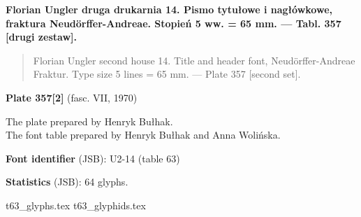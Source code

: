 \documentclass[12pt]{article}
\newcommand{\bg}{\begingl}
\newcommand{\pismoPL}[1]{{\relsize{2}\Junicode\textbf{#1}}}
\newcommand{\pismoEN}[1]{{\relsize{1}\Junicode\begin{quote}#1\end{quote}}}
\newcommand{\plate}[3]{\textbf{Plate #1} (fasc. #2, #3)}
\newcommand{\exampleBib}[1]{{\relsize{2}\Junicode\textbf{The
      example:}\\[2ex] CATALOGUS LIBRORUM \textbf{#1}}}
\newcommand{\exampleDesc}[1]{{\relsize{0}\Junicode#1}}
\newcommand{\exampleDig}[1]{{\relsize{0}\Junicode \textbf{Digitization(s) [JSB]:} #1}}
\newcommand{\exampleLib}[1]{{\relsize{0}\Junicode \textbf{Library:} #1}}
\newcommand{\examplePL}[1]{}
\newcommand{\exampleEN}[1]{}
\newcommand{\fontID}[2]{{\relsize{1}\Junicode\textbf{Font identifier} (JSB): #1 (table #2)}}
\newcommand{\fontstat}[1]{{\relsize{1}\Junicode\textbf{Statistics} (JSB): #1 glyphs.}}
\newcommand{\exampleRef}[1]{{\relsize{0}\Junicode \textbf{References:} #1}}
\newcommand{\examplePage}[1]{{Page reference: \relsize{0}\Junicode#1}}
\begin{document}
 \pismoPL{Florian Ungler druga drukarnia 14.  Pismo tytułowe i
   nagłówkowe, fraktura Neudörffer-Andreae. Stopień 5 ww. = 65 mm. —
   Tabl. 357 [drugi zestaw].}
  
 \pismoEN{Florian Ungler second house 14. Title and header font, Neudörffer-Andreae Fraktur. Type size 5 lines = 65 mm. — Plate 357 [second set].}

\plate{357[2]}{VII}{1970}

The plate prepared by Henryk Bułhak.\\
The font table prepared by Henryk Bułhak and Anna Wolińska.

\bigskip














\bigskip

\fontID{U2-14}{63}

\fontstat{64}

  {t63_glyphs.tex}
  {t63_glyphids.tex}


 \newpage
 
% 

 
\end{document}
